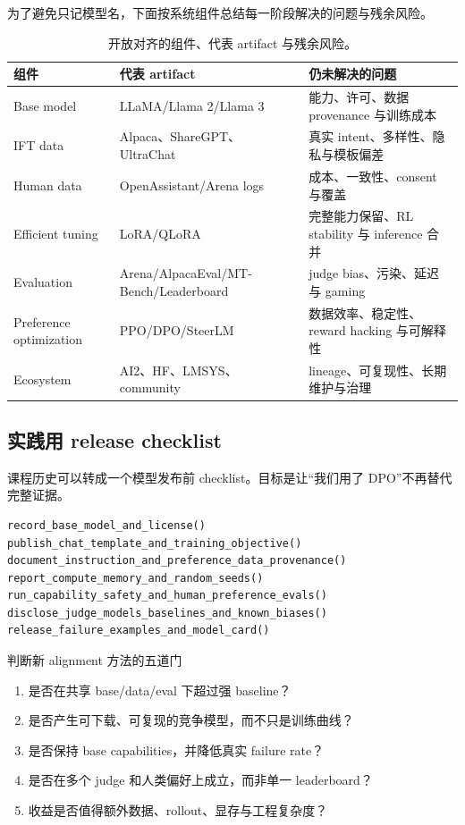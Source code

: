\documentclass[a4paper]{article}
\begin{document}
为了避免只记模型名，下面按系统组件总结每一阶段解决的问题与残余风险。

\begin{table}[H]
\centering
\small
\begin{tabularx}{\textwidth}{L{0.16\textwidth} L{0.22\textwidth} X}
\toprule
组件 & 代表 artifact & 仍未解决的问题 \\
\midrule
Base model & LLaMA/Llama 2/Llama 3 & 能力、许可、数据 provenance 与训练成本 \\
IFT data & Alpaca、ShareGPT、UltraChat & 真实 intent、多样性、隐私与模板偏差 \\
Human data & OpenAssistant/Arena logs & 成本、一致性、consent 与覆盖 \\
Efficient tuning & LoRA/QLoRA & 完整能力保留、RL stability 与 inference 合并 \\
Evaluation & Arena/AlpacaEval/MT-Bench/Leaderboard & judge bias、污染、延迟与 gaming \\
Preference optimization & PPO/DPO/SteerLM & 数据效率、稳定性、reward hacking 与可解释性 \\
Ecosystem & AI2、HF、LMSYS、community & lineage、可复现性、长期维护与治理 \\
\bottomrule
\end{tabularx}
\caption{开放对齐的组件、代表 artifact 与残余风险。}
\end{table}

\subsection{实践用 release checklist}

课程历史可以转成一个模型发布前 checklist。目标是让“我们用了 DPO”不再替代完整证据。

\begin{lstlisting}[caption={Open aligned model release checklist}]
record_base_model_and_license()
publish_chat_template_and_training_objective()
document_instruction_and_preference_data_provenance()
report_compute_memory_and_random_seeds()
run_capability_safety_and_human_preference_evals()
disclose_judge_models_baselines_and_known_biases()
release_failure_examples_and_model_card()
\end{lstlisting}

\begin{importantbox}{判断新 alignment 方法的五道门}
\begin{enumerate}
  \item 是否在共享 base/data/eval 下超过强 baseline？
  \item 是否产生可下载、可复现的竞争模型，而不只是训练曲线？
  \item 是否保持 base capabilities，并降低真实 failure rate？
  \item 是否在多个 judge 和人类偏好上成立，而非单一 leaderboard？
  \item 收益是否值得额外数据、rollout、显存与工程复杂度？
\end{enumerate}
\end{importantbox}
\end{document}
